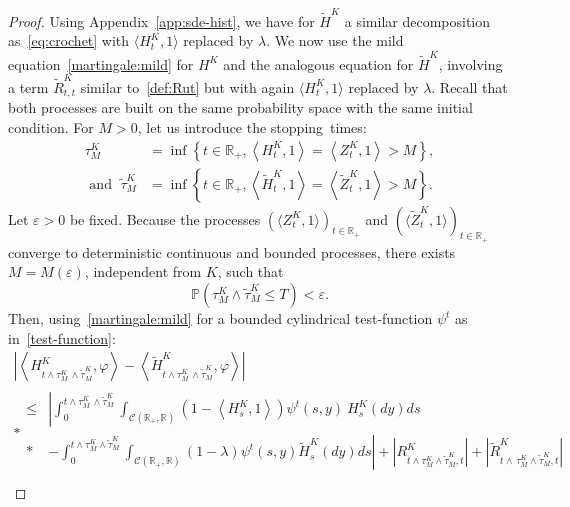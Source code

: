\documentclass[10pt]{amsart}
\theoremstyle{definition}\newtheorem{defi}[theo]{Definition}\newtheorem{rema}[theo]{Remark}\newtheorem{exam}[theo]{Example}\newtheorem{exem}[theo]{Example}\newtheorem{nota}[theo]{Notation}
\newcommand{\Co}{\mathcal{C}}
\renewcommand*\P{\mathbb{P}}
\newcommand*\R{\mathbb{R}}
\begin{document}
\begin{proof}
Using Appendix~\ref{app:sde-hist}, we have for $\widetilde{H}^K$ a similar decomposition as~\eqref{eq:crochet} with $\langle H^{K}_{t},1\rangle$ replaced by $\lambda$. We now use the mild equation~\eqref{martingale:mild} for $H^K$ and the analogous equation for $\widetilde{H}^K$, involving a term $\widetilde{R}^K_{t, t}$ similar to~\eqref{def:Rut} but with again $\langle H^{K}_{t},1\rangle$ replaced by $\lambda$. Recall that both processes are built on the same probability space with the same initial condition. For $M>0$, let us introduce the stopping~times:
\begin{equation}
\begin{split}
 \tau^K_M &=\inf\left\{t\in \R_+,\left\langle H^K_t,1\right\rangle =\left\langle Z^K_t,1\right\rangle > M \right\},\\
\text{ and }\;
\widetilde{\tau}^K_M  &=\inf\left\{t\in \R_+,\left\langle \widetilde{H}^K_t,1\right\rangle =\left\langle \widetilde{Z}^K_t,1\right\rangle > M\right\}.
\end{split}
\end{equation}
Let $\varepsilon>0$ be fixed. Because the processes $(\langle Z^K_t,1\rangle)_{t \in \R_+}$ and $(\langle \widetilde{Z}^K_t,1\rangle)_{t \in \R_+}$ converge to deterministic continuous and bounded processes, there exists $M=M(\varepsilon)$, independent from $K$, such that
\[
\P\left(\tau^K_M \wedge \widetilde{\tau}^K_M\leq T\right)<\varepsilon.
\]
Then, using~\eqref{martingale:mild} for a bounded cylindrical test-function $\psi^t$ as in~\eqref{test-function}:
\begingroup
\allowdisplaybreaks
\begin{multline*}
\left|\left\langle H^{K}_{t \wedge \tau^K_M\,\wedge \widetilde{\tau}^K_M},\varphi\right\rangle-\left\langle\widetilde{H}^{K}_{t \wedge \tau^K_M\,\wedge  \widetilde{\tau}^K_M},\varphi \right\rangle \right| \\*
\begin{aligned}
\leq & \left|\int_0^{t \wedge \tau^K_M\,\wedge  \widetilde{\tau}^K_M} \int_{\Co\left(\R_+, \R\right)} \left(1- \left\langle H^K_s,1\right\rangle\right)\psi^t(s,y)\ H^K_s(dy)  ds \right.\\*
& \left. - \int_0^{t \wedge \tau^K_M \wedge \widetilde{\tau}^K_M} \int_{\Co\left(\R_+, \R\right)} \left(1- \lambda\right)\psi^t(s,y)\widetilde{H}^K_s(dy) ds \right| + \left| R_{t \wedge \tau^K_M \wedge  \widetilde{\tau}^K_M, t}^{K} \right| + \left|\widetilde{R}_{t \wedge\,\tau^K_M \wedge  \widetilde{\tau}^K_M, t}^K\right|\\

\end{aligned}
\end{multline*}
\end{proof}
\end{document}

